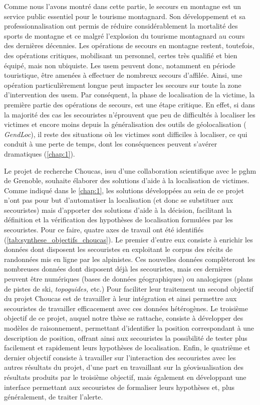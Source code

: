 Comme nous l'avons montré dans cette partie, le secours en montagne
est un service public essentiel pour le tourisme montagnard. Son
développement et sa professionnalisation ont permis de réduire
considérablement la mortalité des sports de montagne et ce malgré
l'explosion du tourisme montagnard au cours des dernières
décennies. Les opérations de secours en montagne restent, toutefois,
des opérations critiques, mobilisant un personnel, certes très
qualifié et bien équipé, mais non ubiquiste. Les \ac{usem} peuvent
donc, notamment en période touristique, être amenées à effectuer de
nombreux secours d'affilée. Ainsi, une opération particulièrement
longue peut impacter les secours sur toute la zone d'intervention des
\ac{usem}. Par conséquent, la phase de localisation de la victime, \ie
la première partie des opérations de secours, est une étape
critique. En effet, si dans la majorité des cas les secouristes
n'éprouvent que peu de difficultés à localiser les victimes et encore
moins depuis la généralisation des outils de géolocalisation (\eg
\emph{GendLoc}), il reste des situations où les victimes sont
difficiles à localiser, ce qui conduit à une perte de temps, dont les
conséquences peuvent s'avérer dramatiques (\autoref{chap:1}).

Le projet de recherche Choucas, issu d'une collaboration scientifique
avec le \ac{pghm} de Grenoble, souhaite élaborer des solutions d'aide
à la localisation de victimes. Comme indiqué dans le \autoref{chap:1},
les solutions développées au sein de ce projet n'ont pas pour but
d'automatiser la localisation (et donc se substituer aux secouristes)
mais d'apporter des solutions d'aide à la décision, facilitant la
définition et la vérification des hypothèses de localisation formulées
par les secouristes. Pour ce faire, quatre axes de travail ont été
identifiés (\autoref{tab:synthese_objectifs_choucas}). Le premier
d'entre eux consiste à enrichir les données dont disposent les
secouristes en exploitant le corpus des récits de randonnées mis en
ligne par les alpinistes. Ces nouvelles données complèteront les
nombreuses données dont disposent déjà les secouristes, mais ces
dernières peuvent être numériques (\eg bases de données géographiques)
ou analogiques (\eg plans de pistes de ski, \emph{topoguides,} etc.)
%
Pour faciliter leur traitement un second objectif du projet Choucas
est de travailler à leur intégration et ainsi permettre aux
secouristes de travailler efficacement avec ces données hétérogènes.
%
Le troisième objectif de ce projet, auquel notre thèse se rattache,
consiste à développer des modèles de raisonnement, permettant
d'identifier la position correspondant à une description de position,
offrant ainsi aux secouristes la possibilité de tester plus facilement
et rapidement leurs hypothèses de localisation.
%
Enfin, le quatrième et dernier objectif consiste à travailler sur
l'interaction des secouristes avec les autres résultats du projet,
d'une part en travaillant sur la géovisualisation des résultats
produits par le troisième objectif, mais également en développant une
interface permettant aux secouristes de formaliser leurs hypothèses
et, plus généralement, de traiter l'alerte.

